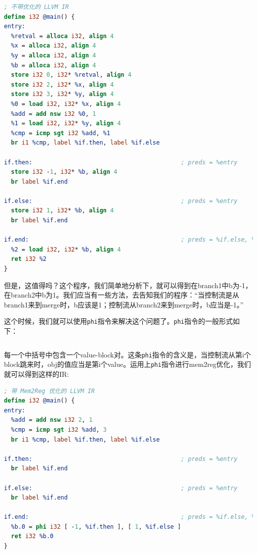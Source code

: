 \begin{lstlisting}[language=LLVM]
; 不带优化的 LLVM IR
define i32 @main() {
entry:
  %retval = alloca i32, align 4
  %x = alloca i32, align 4
  %y = alloca i32, align 4
  %b = alloca i32, align 4
  store i32 0, i32* %retval, align 4
  store i32 2, i32* %x, align 4
  store i32 3, i32* %y, align 4
  %0 = load i32, i32* %x, align 4
  %add = add nsw i32 %0, 1
  %1 = load i32, i32* %y, align 4
  %cmp = icmp sgt i32 %add, %1
  br i1 %cmp, label %if.then, label %if.else

if.then:                                          ; preds = %entry
  store i32 -1, i32* %b, align 4
  br label %if.end

if.else:                                          ; preds = %entry
  store i32 1, i32* %b, align 4
  br label %if.end

if.end:                                           ; preds = %if.else, %if.then
  %2 = load i32, i32* %b, align 4
  ret i32 %2
}
\end{lstlisting}

但是，这值得吗？这个程序，我们简单地分析下，就可以得到在branch1中b为-1，在branch2中b为1。我们应当有一些方法，去告知我们的程序：“当控制流是从branch1来到merge时，b应该是1；控制流从branch2来到merge时，b应当是-1。”

这个时候，我们就可以使用\texttt{phi}指令来解决这个问题了。\texttt{phi}指令的一般形式如下：

\begin{lstlisting}[language=LLVM]
    %obj = phi <type> [ <val1>, <block1> ], [ <val2>, <block2> ], [ <val3>, <block3> ]
\end{lstlisting}

每一个中括号中包含一个value-block对。这条\texttt{phi}指令的含义是，当控制流从第i个block跳来时，obj的值应当是第i个value。运用上\texttt{phi}指令进行mem2reg优化，我们就可以得到这样的IR:

\begin{lstlisting}[language=LLVM]
; 带 Mem2Reg 优化的 LLVM IR
define i32 @main() {
entry:
  %add = add nsw i32 2, 1
  %cmp = icmp sgt i32 %add, 3
  br i1 %cmp, label %if.then, label %if.else

if.then:                                          ; preds = %entry
  br label %if.end

if.else:                                          ; preds = %entry
  br label %if.end
    
if.end:                                           ; preds = %if.else, %if.then
  %b.0 = phi i32 [ -1, %if.then ], [ 1, %if.else ]
  ret i32 %b.0
}
\end{lstlisting}

